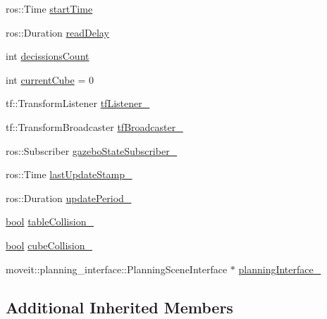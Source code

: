 \begin{DoxyCompactItemize}
ros\+::\+Time \hyperlink{classsm__moveit__3_1_1cl__perception__system_1_1ClPerceptionSystem_adbc00ec0624260b9a927cf927fb1f549}{start\+Time}
\item 
ros\+::\+Duration \hyperlink{classsm__moveit__3_1_1cl__perception__system_1_1ClPerceptionSystem_ad8826a690d57933b8adbe9011679f600}{read\+Delay}
\item 
int \hyperlink{classsm__moveit__3_1_1cl__perception__system_1_1ClPerceptionSystem_a05c619f211e49dcfbcd3321c968ce1fc}{decissions\+Count}
\item 
int \hyperlink{classsm__moveit__3_1_1cl__perception__system_1_1ClPerceptionSystem_ad915fc687481d4157ec40de52f8eaa82}{current\+Cube} = 0
\item 
tf\+::\+Transform\+Listener \hyperlink{classsm__moveit__3_1_1cl__perception__system_1_1ClPerceptionSystem_a70200ab04170e5f6057322b03501dc1f}{tf\+Listener\+\_\+}
\item 
tf\+::\+Transform\+Broadcaster \hyperlink{classsm__moveit__3_1_1cl__perception__system_1_1ClPerceptionSystem_a4b10961feb7c1609a6260656f20798d8}{tf\+Broadcaster\+\_\+}
\item 
ros\+::\+Subscriber \hyperlink{classsm__moveit__3_1_1cl__perception__system_1_1ClPerceptionSystem_a66371d7b71709d9286e63ee92f6507c5}{gazebo\+State\+Subscriber\+\_\+}
\item 
ros\+::\+Time \hyperlink{classsm__moveit__3_1_1cl__perception__system_1_1ClPerceptionSystem_a6f6130fd8e122238855516f6e74eb4e7}{last\+Update\+Stamp\+\_\+}
\item 
ros\+::\+Duration \hyperlink{classsm__moveit__3_1_1cl__perception__system_1_1ClPerceptionSystem_afc43ae86f2e0074f1ef1650284f54deb}{update\+Period\+\_\+}
\item 
\hyperlink{classbool}{bool} \hyperlink{classsm__moveit__3_1_1cl__perception__system_1_1ClPerceptionSystem_a5f5208264dee3b68129e1d9560867f01}{table\+Collision\+\_\+}
\item 
\hyperlink{classbool}{bool} \hyperlink{classsm__moveit__3_1_1cl__perception__system_1_1ClPerceptionSystem_a939dd657fa6c5e05ee171b2ec7daad1f}{cube\+Collision\+\_\+}
\item 
moveit\+::planning\+\_\+interface\+::\+Planning\+Scene\+Interface $\ast$ \hyperlink{classsm__moveit__3_1_1cl__perception__system_1_1ClPerceptionSystem_aa59191e3993ffbfc8e8332f76d727259}{planning\+Interface\+\_\+}
\end{DoxyCompactItemize}
\subsection*{Additional Inherited Members}


